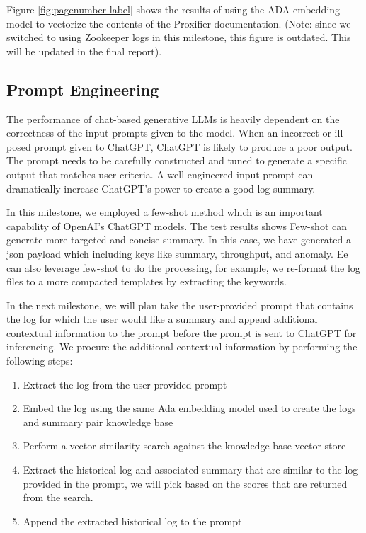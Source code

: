 \documentclass[conference]{IEEEtran}
\begin{document}
Figure \ref{fig:pagenumber-label} shows the results of using the ADA embedding model to vectorize the contents of the Proxifier documentation. (Note: since we switched to using Zookeeper logs in this milestone, this figure is outdated. This will be updated in the final report).

\subsection{Prompt Engineering}

The performance of chat-based generative LLMs is heavily dependent on the correctness of the input prompts given to the model. When an incorrect or ill-posed prompt given to ChatGPT, ChatGPT is likely to produce a poor output. The prompt needs to be carefully constructed and tuned to generate a specific output that matches user criteria. A well-engineered input prompt can dramatically increase ChatGPT's power to create a good log summary.

In this milestone, we employed a few-shot method which is an important capability of OpenAI's ChatGPT models. The test results shows Few-shot can generate more targeted
and concise summary. In this case, we have generated a json payload which including keys like summary, throughput, and anomaly. Ee can also leverage few-shot to do the processing, for example, we re-format the log files to a more compacted templates by extracting the keywords.

In the next milestone, we will plan take the user-provided prompt that contains the log for which the user would like a summary and append additional contextual information to the prompt before the prompt is sent to ChatGPT for inferencing. We procure the additional contextual information by performing the following steps:


\begin{enumerate}
    \item Extract the log from the user-provided prompt
    \item Embed the log using the same Ada embedding model used to create the logs and summary pair knowledge base
    \item Perform a vector similarity search against the knowledge base vector store
    \item Extract the historical log and associated summary that are similar to the log provided in the prompt, we will pick based on the scores that are returned from the search.
    \item Append the extracted historical log to the prompt
\end{enumerate}
\end{document}
